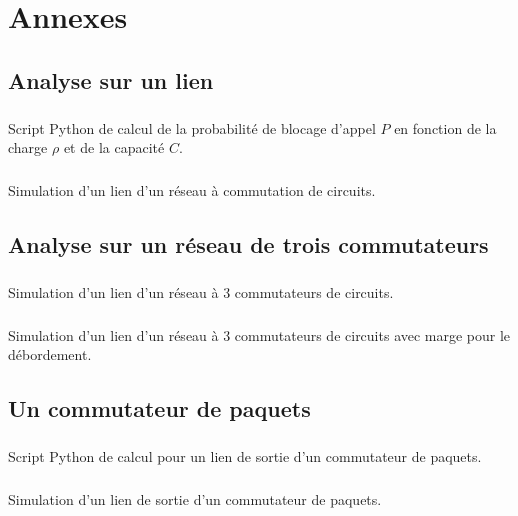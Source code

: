 %
\appendix{}
%
\chapter{Annexes}
%
%
    \section{Analyse sur un lien}
%
        \paragraph{}
            \label{seullien-script}
Script Python de calcul de la probabilité de blocage d'appel $P$ en fonction de la charge $\rho$ et de la capacité $C$.

    \clearpage
%
        \paragraph{}
Simulation d'un lien d'un réseau à commutation de circuits.

    \clearpage
%
%
%
    \section{Analyse sur un réseau de trois commutateurs}
%
        \paragraph{}
Simulation d'un lien d'un réseau à 3 commutateurs de circuits.

    \clearpage
%
        \paragraph{}
Simulation d'un lien d'un réseau à 3 commutateurs de circuits avec marge pour le débordement.

    \clearpage
%
%
%
    \section{Un commutateur de paquets}
%
        \paragraph{}
Script Python de calcul pour un lien de sortie d'un commutateur de paquets.

    \clearpage{}
%
        \paragraph{}
Simulation d'un lien de sortie d'un commutateur de paquets.

    \clearpage{}
%

